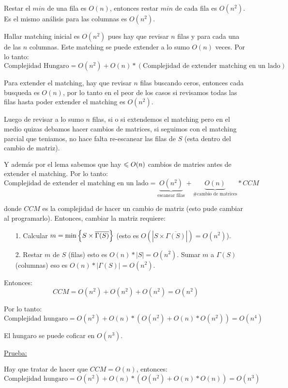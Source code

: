 \documentclass[12pt,a4paper]{article}
\begin{document}
Restar el $min$ de una fila es $O(n)$, entonces restar $min$ de 
cada fila es $O(n^2)$. Es el mismo análisis para las columnas 
es $O(n^{2})$.
\medskip

Hallar matching inicial es $O(n^2)$ pues hay que revisar $n$ filas y para cada 
una de las $n$ columnas. Este matching se puede extender a lo sumo 
$O(n)$ veces. Por lo tanto:
$$\text{Complejidad Hungaro} = O(n^2) + O(n)*(\text{Complejidad de extender matching en un lado})$$

Para extender el matching, hay que revisar $n$ filas buscando ceros, entonces cada 
busqueda es $O(n)$, por lo tanto en el peor de los casos si revisamos todas
las filas hasta poder extender el matching es $O(n^{2})$.
\medskip

Luego de revisar a lo sumo $n$ filas, si o si extendemos el matching pero 
en el medio quizas debamos hacer cambios de matrices, si seguimos con el matching 
parcial que teniamos, no hace falta re-escanear las filas de $S$ (esta dentro del 
cambio de matriz).
\medskip

Y además por el lema sabemos que hay $\leqslant O(n)$ cambios de matries antes de extender 
el matching. Por lo tanto:
$$\text{Complejidad de extender el matching en un lado} = \underbrace{O(n^{2})}_{\text{escanear filas}} + \underbrace{O(n)}_{\text{\# cambio de matrices}} * CCM$$

donde $CCM$ es la complejidad de hacer un cambio de matriz (esto pude cambiar al programarlo).
Entonces, cambiar la matriz requiere:
\medskip

\begin{itemize}
    \item [1.] Calcular $m = \min \left\lbrace S \times \overline{\Gamma(S)} \right\rbrace$ (esto es $O(|S \times \overline{\Gamma(S)}|)=O(n^2)$).
    \item [2.] Restar $m$ de $S$ (filas) esto es $O(n)*|S| = O(n^2)$. Sumar $m$ a $\Gamma(S)$ (columnas) 
        eso es $O(n)*|\Gamma(S)| = O(n^2)$.
\end{itemize}
Entonces:
$$CCM = O(n^2) + O(n^2) + O(n^2) = O(n^2)$$

Por lo tanto:
$$\text{Complejidad hungaro} = O(n^{2}) + O(n)*(O(n^{2}) + O(n)*O(n^{2})) = O(n^{4})$$

\begin{teorema} El hungaro se puede coficar en $O(n^3)$.
\end{teorema}
\underline{Prueba:}
\medskip

Hay que tratar de hacer que $CCM = O(n)$, entonces:
$$\text{Complejidad hungaro} = O(n^{2}) + O(n)*(O(n^{2}) + O(n)*O(n)) = O(n^{3})$$
\end{document}

